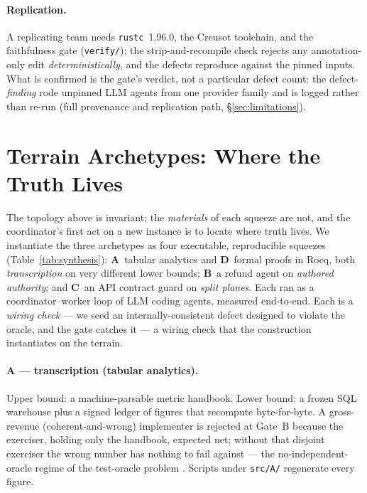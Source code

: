 \documentclass[11pt]{article}
\newcommand{\code}[1]{\texttt{#1}}
\begin{document}
\paragraph{Replication.} A replicating team needs \code{rustc}~1.96.0, the Creusot toolchain, and the
faithfulness gate (\code{verify/}); the strip-and-recompile check rejects any annotation-only edit
\emph{deterministically}, and the \ResRWBugsNum{} defects reproduce against the pinned inputs. What is
confirmed is the gate's verdict, not a particular defect count: the defect-\emph{finding} rode unpinned
LLM agents from one provider family and is logged rather than re-run (full provenance and replication
path, \S\ref{sec:limitations}).

\section{Terrain Archetypes: Where the Truth Lives}
\label{sec:archetypes}

The topology above is invariant; the \emph{materials} of each squeeze are not, and the coordinator's
first act on a new instance is to locate where truth lives. We instantiate the three archetypes as four
executable, reproducible squeezes (Table~\ref{tab:synthesis}): \textbf{A}~tabular analytics and
\textbf{D}~formal proofs in Rocq, both \emph{transcription} on very different lower bounds;
\textbf{B}~a refund agent on \emph{authored authority}; and \textbf{C}~an API contract guard on
\emph{split planes}. Each ran as a coordinator--worker loop of LLM coding agents, measured end-to-end.
Each is a \emph{wiring check} --- we seed an internally-consistent defect designed to violate the
oracle, and the gate catches it --- a wiring check that the construction instantiates on the terrain.

\paragraph{A --- transcription (tabular analytics).}\label{sec:caseD} Upper bound: a machine-parsable
metric handbook. Lower bound: a frozen SQL warehouse plus a signed ledger of
\ResWorkedCertifiedMetrics{} figures that recompute byte-for-byte. A gross-revenue (coherent-and-wrong)
implementer is rejected at Gate~B because the exerciser, holding only the handbook, expected net;
without that disjoint exerciser the wrong number has nothing to fail against --- the no-independent-oracle
regime of the test-oracle problem \citep{barr2015oracle}. Scripts under \code{src/A/} regenerate every
figure.
\end{document}
